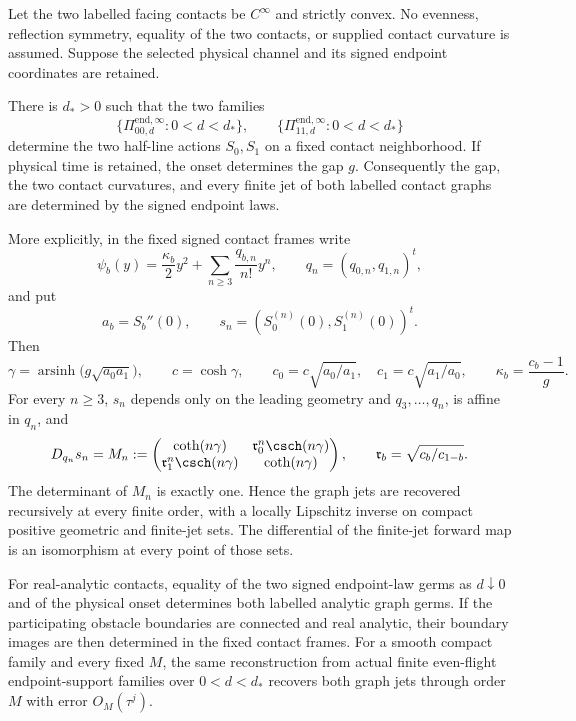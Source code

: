 \begin{theorem}
\label{thm:v21-signed-rigidity}
Let the two labelled facing contacts be $C^\infty$ and strictly convex.  No
evenness, reflection symmetry, equality of the two contacts, or supplied
contact curvature is assumed.  Suppose the selected physical channel and
its signed endpoint coordinates are retained.

There is $d_*>0$ such that the two families
\[
 \{\Pi^{\mathrm{end},\infty}_{00,d}:0<d<d_*\},\qquad
 \{\Pi^{\mathrm{end},\infty}_{11,d}:0<d<d_*\}
\]
determine the two half-line actions $S_0,S_1$ on a fixed contact
neighborhood.  If physical time is retained, the onset determines the gap
$g$.  Consequently the gap, the two contact curvatures, and every finite jet
of both labelled contact graphs are determined by the signed endpoint laws.

More explicitly, in the fixed signed contact frames write
\begin{equation}\label{eq:v21-general-contact-jets}
 \psi_b(y)=\frac{\kappa_b}{2}y^2+
       \sum_{n\ge3}\frac{q_{b,n}}{n!}y^n,
 \qquad q_n=(q_{0,n},q_{1,n})^t,
\end{equation}
and put
\[
 a_b=S_b''(0),\qquad
 s_n=(S_0^{(n)}(0),S_1^{(n)}(0))^t.
\]
Then
\begin{equation}\label{eq:v21-leading-recovery}
 \gamma=\operatorname{arsinh}\!\bigl(g\sqrt{a_0a_1}\bigr),\qquad
 c=\cosh\gamma,
 \qquad
 c_0=c\sqrt{a_0/a_1},\quad c_1=c\sqrt{a_1/a_0},
 \qquad
 \kappa_b=\frac{c_b-1}{g}.
\end{equation}
For every $n\ge3$, $s_n$ depends only on the leading geometry and
$q_3,\ldots,q_n$, is affine in $q_n$, and
\begin{equation}\label{eq:v21-general-jet-block}
 D_{q_n}s_n=
 M_n:=
 \begin{pmatrix}
 \coth(n\gamma)&\mathfrak r_0^n\csch(n\gamma)\\
 \mathfrak r_1^n\csch(n\gamma)&\coth(n\gamma)
 \end{pmatrix},
 \qquad
 \mathfrak r_b=\sqrt{c_b/c_{1-b}}.
\end{equation}
The determinant of $M_n$ is exactly one.  Hence the graph jets are recovered
recursively at every finite order, with a locally Lipschitz inverse on compact
positive geometric and finite-jet sets.  The differential of the finite-jet
forward map is an isomorphism at every point of those sets.

For real-analytic contacts, equality of the two signed endpoint-law germs as
$d\downarrow0$ and of the physical onset determines both labelled analytic
graph germs.  If the participating obstacle boundaries are connected and
real analytic, their boundary images are then determined in the fixed
contact frames.  For a smooth compact family and every fixed $M$, the same
reconstruction from actual finite even-flight endpoint-support families over
$0<d<d_*$ recovers both graph jets through order $M$ with error
$O_M(\tau^j)$.
\end{theorem}

